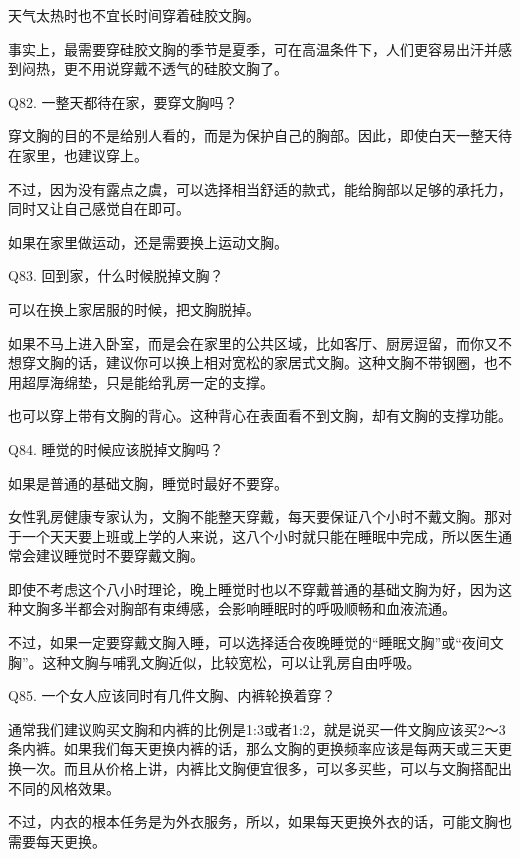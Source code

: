 \documentclass[12pt,UTF8]{ctexbook}
\begin{document}
天气太热时也不宜长时间穿着硅胶文胸。

事实上，最需要穿硅胶文胸的季节是夏季，可在高温条件下，人们更容易出汗并感到闷热，更不用说穿戴不透气的硅胶文胸了。





Q82. 一整天都待在家，要穿文胸吗？


穿文胸的目的不是给别人看的，而是为保护自己的胸部。因此，即使白天一整天待在家里，也建议穿上。

不过，因为没有露点之虞，可以选择相当舒适的款式，能给胸部以足够的承托力，同时又让自己感觉自在即可。

如果在家里做运动，还是需要换上运动文胸。





Q83. 回到家，什么时候脱掉文胸？


可以在换上家居服的时候，把文胸脱掉。

如果不马上进入卧室，而是会在家里的公共区域，比如客厅、厨房逗留，而你又不想穿文胸的话，建议你可以换上相对宽松的家居式文胸。这种文胸不带钢圈，也不用超厚海绵垫，只是能给乳房一定的支撑。

也可以穿上带有文胸的背心。这种背心在表面看不到文胸，却有文胸的支撑功能。





Q84. 睡觉的时候应该脱掉文胸吗？


如果是普通的基础文胸，睡觉时最好不要穿。

女性乳房健康专家认为，文胸不能整天穿戴，每天要保证八个小时不戴文胸。那对于一个天天要上班或上学的人来说，这八个小时就只能在睡眠中完成，所以医生通常会建议睡觉时不要穿戴文胸。

即使不考虑这个八小时理论，晚上睡觉时也以不穿戴普通的基础文胸为好，因为这种文胸多半都会对胸部有束缚感，会影响睡眠时的呼吸顺畅和血液流通。

不过，如果一定要穿戴文胸入睡，可以选择适合夜晚睡觉的“睡眠文胸”或“夜间文胸”。这种文胸与哺乳文胸近似，比较宽松，可以让乳房自由呼吸。





Q85. 一个女人应该同时有几件文胸、内裤轮换着穿？


通常我们建议购买文胸和内裤的比例是1:3或者1:2，就是说买一件文胸应该买2～3条内裤。如果我们每天更换内裤的话，那么文胸的更换频率应该是每两天或三天更换一次。而且从价格上讲，内裤比文胸便宜很多，可以多买些，可以与文胸搭配出不同的风格效果。

不过，内衣的根本任务是为外衣服务，所以，如果每天更换外衣的话，可能文胸也需要每天更换。
\end{document}
